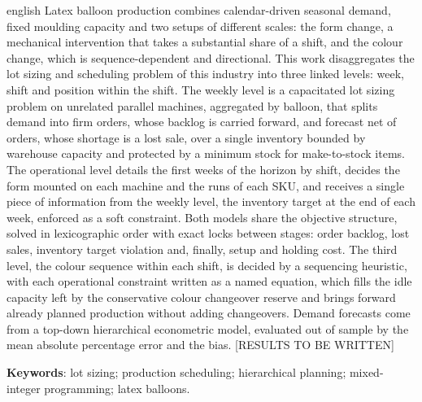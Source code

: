 \documentclass[
    12pt,
    openright,
    oneside,
    a4paper,
    fleqn,
    chapter=TITLE,
    section=TITLE,
    english,
    brazil
]{abntex2}
\newcommand{\listofquadrosname}{Lista de quadros}
\begin{document}
\begin{resumo}[Abstract]
\begin{otherlanguage*}{english}
Latex balloon production combines calendar-driven seasonal demand, fixed moulding capacity and two setups of different scales: the form change, a mechanical intervention that takes a substantial share of a shift, and the colour change, which is sequence-dependent and directional. This work disaggregates the lot sizing and scheduling problem of this industry into three linked levels: week, shift and position within the shift. The weekly level is a capacitated lot sizing problem on unrelated parallel machines, aggregated by balloon, that splits demand into firm orders, whose backlog is carried forward, and forecast net of orders, whose shortage is a lost sale, over a single inventory bounded by warehouse capacity and protected by a minimum stock for make-to-stock items. The operational level details the first weeks of the horizon by shift, decides the form mounted on each machine and the runs of each SKU, and receives a single piece of information from the weekly level, the inventory target at the end of each week, enforced as a soft constraint. Both models share the objective structure, solved in lexicographic order with exact locks between stages: order backlog, lost sales, inventory target violation and, finally, setup and holding cost. The third level, the colour sequence within each shift, is decided by a sequencing heuristic, with each operational constraint written as a named equation, which fills the idle capacity left by the conservative colour changeover reserve and brings forward already planned production without adding changeovers. Demand forecasts come from a top-down hierarchical econometric model, evaluated out of sample by the mean absolute percentage error and the bias. [RESULTS TO BE WRITTEN]

\textbf{Keywords}: lot sizing; production scheduling; hierarchical planning; mixed-integer programming; latex balloons.
\end{otherlanguage*}
\end{resumo}

\listoffigures*
\cleardoublepage

\pdfbookmark[0]{\listofquadrosname}{loq}
\listofquadros*
\cleardoublepage
\end{document}
